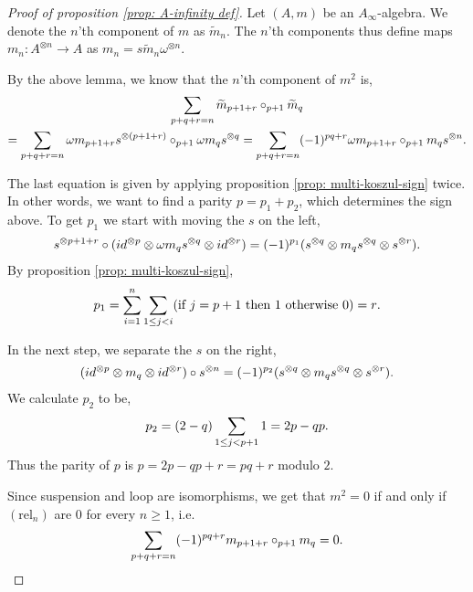 \documentclass[../thesis.tex]{subfiles}
\begin{document}
        \begin{proof}[Proof of proposition \ref{prop: A-infinity def}]
            Let $(A,m)$ be an $A_\infty$-algebra. We denote the $n$'th component of $m$ as $\widetilde{m}_n$. The $n$'th components thus define maps $m_n:A^{\otimes n}\rightarrow A$ as $m_n = s\widetilde{m}_n \omega^{\otimes n}$.

            By the above lemma, we know that the $n$'th component of $m^2$ is,
            \begin{multline*}
                \sum_{p + q + r = n}\widetilde{m}_{p+1+r}\circ_{p+1}\widetilde{m}_q \\
                = \sum_{p + q + r = n}\omega m_{p+1+r}s^{\otimes (p+1+r)}\circ_{p+1}\omega m_qs^{\otimes q} = \sum_{p + q + r = n}(-1)^{pq+r}\omega m_{p+1+r}\circ_{p+1}m_q s^{\otimes n}\tt{.}
            \end{multline*}

            The last equation is given by applying proposition \ref{prop: multi-koszul-sign} twice. In other words, we want to find a parity $p = p_1 + p_2$, which determines the sign above. To get $p_1$ we start with moving the $s$ on the left,
            \begin{align*}
                s^{\otimes p + 1 + r} \circ (id^{\otimes p} \otimes \omega m_q s^{\otimes q} \otimes id^{\otimes r}) = (-1)^{p_1}(s^{\otimes q} \otimes m_q s^{\otimes q} \otimes s^{\otimes r})\tt{.}
            \end{align*}
            By proposition \ref{prop: multi-koszul-sign},
            \begin{align*}
                p_1 = \sum_{i=1}^n\sum_{1\leq j < i}(\tt{if }j = p+1\tt{ then }1\tt{ otherwise }0) = r\tt{.}
            \end{align*}

            In the next step, we separate the $s$ on the right,
            \begin{align*}
                (id^{\otimes p}\otimes m_q \otimes id^{\otimes r}) \circ s^{\otimes n} = (-1)^{p_2}(s^{\otimes q}\otimes m_qs^{\otimes q}\otimes s^{\otimes r})\tt{.}
            \end{align*}
            We calculate $p_2$ to be,
            \begin{align*}
                p_2 = (2-q)\sum_{1\leq j < p+1}1 = 2p - qp\tt{.}
            \end{align*}
            Thus the parity of $p$ is $p = 2p - qp + r = pq + r$ modulo $2$.

            Since suspension and loop are isomorphisms, we get that $m^2 = 0$ if and only if $(\text{rel}_n)$ are $0$ for every $n\geq 1$, i.e.
            \begin{align*}
                \sum_{p+q+r = n} (-1)^{pq+r} m_{p+1+r} \circ_{p+1} m_q = 0\tt{.}
            \end{align*}
        \end{proof}
\end{document}
